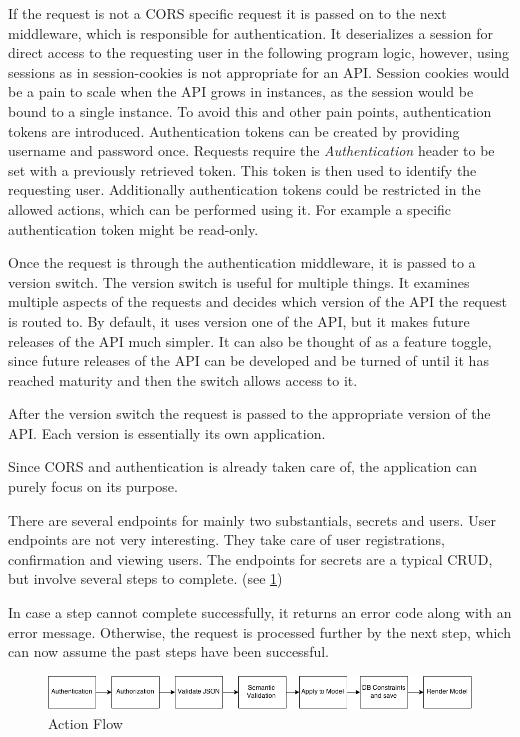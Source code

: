 If the request is not a CORS specific request it is passed on to the next
middleware, which is responsible for authentication. It deserializes a session
for direct access to the requesting user in the following program logic,
however, using sessions as in session-cookies is not appropriate for an API.
Session cookies would be a pain to scale when the API grows in instances, as
the session would be bound to a single instance. To avoid this and other pain
points, authentication tokens are introduced. Authentication tokens can be
created by providing username and password once. Requests require the
\textit{Authentication} header to be set with a previously retrieved token.
This token is then used to identify the requesting user. Additionally
authentication tokens could be restricted in the allowed actions, which can be
performed using it. For example a specific authentication token might be
read-only.

Once the request is through the authentication middleware, it is passed to a
version switch. The version switch is useful for multiple things. It examines
multiple aspects of the requests and decides which version of the API the
request is routed to. By default, it uses version one of the API, but it makes
future releases of the API much simpler. It can also be thought of as a feature
toggle, since future releases of the API can be developed and be turned of
until it has reached maturity and then the switch allows access to it.

After the version switch the request is passed to the appropriate version of
the API. Each version is essentially its own application.

Since CORS and authentication is already taken care of, the application can
purely focus on its purpose.

There are several endpoints for mainly two substantials, secrets and users.
User endpoints are not very interesting. They take care of user registrations,
confirmation and viewing users. The endpoints for secrets are a typical CRUD,
but involve several steps to complete. (see \ref{fig:action_flow})

In case a step cannot complete successfully, it returns an error code along
with an error message. Otherwise, the request is processed further by the next
step, which can now assume the past steps have been successful.

\begin{figure}
  \includegraphics[scale=0.50]{pictures/action_flow.png}
  \caption{Action Flow}
  \centering
  \label{fig:action_flow}
\end{figure}

